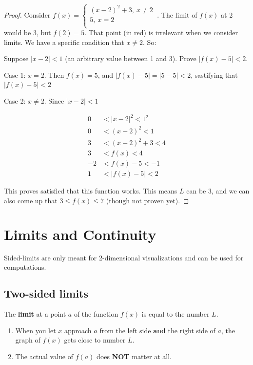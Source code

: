 \documentclass[12pt]{article}
\theoremstyle{plain}
\theoremstyle{remark}
\theoremstyle{definition}
\begin{document}
\begin{proof}

Consider \(f(x) = \left\{ \begin{matrix}
(x - 2)^{2} + 3,\ x \neq 2 \\
5,\ x = 2 \\
\end{matrix} \right.\ \). The limit of \(f(x)\) at 2 would be 3, but
\(f(2) = 5\). That point (in red) is irrelevant when we consider limits.
We have a specific condition that \(x \neq 2\). So:

Suppose \(|x - 2| < 1\) (an arbitrary value between 1 and 3). Prove
\(\left| f(x) - 5 \right| < 2\).

Case 1: \(x = 2\). Then \(f(x) = 5\), and
\(\left| f(x) - 5 \right| = |5 - 5| < 2\), sastifying that
\(\left| f(x) - 5 \right| < 2\)

Case 2: \(x \neq 2\). Since \(|x - 2| < 1\)

\begin{align*}
0 &< |x - 2|^{2} < 1^{2} \\
0 &< (x - 2)^{2} < 1 \\
3 &< (x - 2)^{2} + 3 < 4 \\
3 &< f(x) < 4 \\
- 2 &< f(x) - 5 < - 1 \\
1 &< \left| f(x) - 5 \right| < 2
\end{align*}


This proves satisfied that this function works. This means \(L\) can be
3, and we can also come up that \(3 \leq f(x) \leq 7\) (though not
proven yet).



\end{proof}
\section{Limits and Continuity}

Sided-limits are only meant for 2-dimensional visualizations and can be
used for computations.


\subsection{Two-sided limits}

The \textbf{limit} at a point \(a\) of the function \(f(x)\) is equal to
the number \(L\).

\begin{enumerate}
\def\labelenumi{\arabic{enumi}.}
\item
  When you let \(x\) approach \(a\) from the left side \textbf{and} the
  right side of \(a\), the graph of \(f(x)\) gets close to number \(L\).
\item
  The actual value of \(f(a)\) does \textbf{NOT} matter at all.
\end{enumerate}
\end{document}
